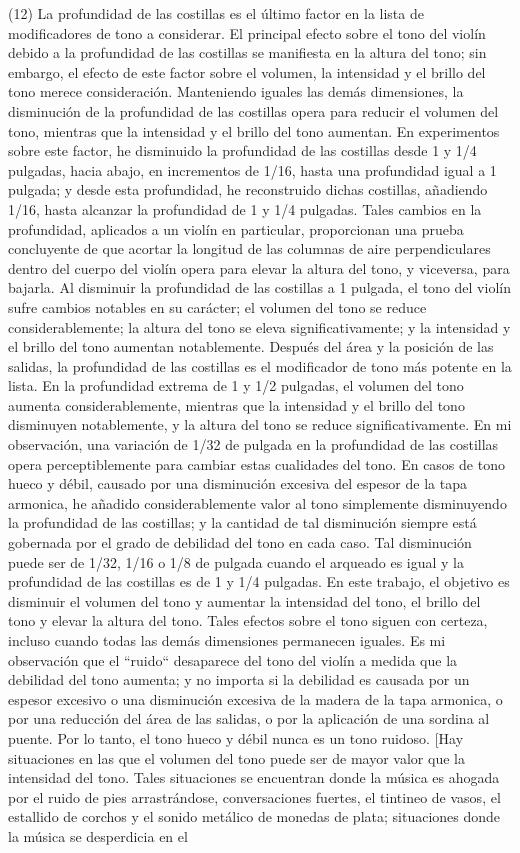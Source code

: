 \documentclass[12pt]{book}
\begin{document}
(12) La profundidad de las costillas es el último factor en la lista de modificadores de tono a considerar. El principal efecto sobre el tono del violín debido a la profundidad de las costillas se manifiesta en la altura del tono; sin embargo, el efecto de este factor sobre el volumen, la intensidad y el brillo del tono merece consideración. Manteniendo iguales las demás dimensiones, la disminución de la profundidad de las costillas opera para reducir el volumen del tono, mientras que la intensidad y el brillo del tono aumentan. En experimentos sobre este factor, he disminuido la profundidad de las costillas desde 1 y 1/4 pulgadas, hacia abajo, en incrementos de 1/16, hasta una profundidad igual a 1 pulgada; y desde esta profundidad, he reconstruido dichas costillas, añadiendo 1/16, hasta alcanzar la profundidad de 1 y 1/4 pulgadas. Tales cambios en la profundidad, aplicados a un violín en particular, proporcionan una prueba concluyente de que acortar la longitud de las columnas de aire perpendiculares dentro del cuerpo del violín opera para elevar la altura del tono, y viceversa, para bajarla. Al disminuir la profundidad de las costillas a 1 pulgada, el tono del violín sufre cambios notables en su carácter; el volumen del tono se reduce considerablemente; la altura del tono se eleva significativamente; y la intensidad y el brillo del tono aumentan notablemente. Después del área y la posición de las salidas, la profundidad de las costillas es el modificador de tono más potente en la lista. En la profundidad extrema de 1 y 1/2 pulgadas, el volumen del tono aumenta considerablemente, mientras que la intensidad y el brillo del tono disminuyen notablemente, y la altura del tono se reduce significativamente. En mi observación, una variación de 1/32 de pulgada en la profundidad de las costillas opera perceptiblemente para cambiar estas cualidades del tono. En casos de tono hueco y débil, causado por una disminución excesiva del espesor de la tapa armonica, he añadido considerablemente valor al tono simplemente disminuyendo la profundidad de las costillas; y la cantidad de tal disminución siempre está gobernada por el grado de debilidad del tono en cada caso. Tal disminución puede ser de 1/32, 1/16 o 1/8 de pulgada cuando el arqueado es igual y la profundidad de las costillas es de 1 y 1/4 pulgadas. En este trabajo, el objetivo es disminuir el volumen del tono y aumentar la intensidad del tono, el brillo del tono y elevar la altura del tono. Tales efectos sobre el tono siguen con certeza, incluso cuando todas las demás dimensiones permanecen iguales. Es mi observación que el ``ruido`` desaparece del tono del violín a medida que la debilidad del tono aumenta; y no importa si la debilidad es causada por un espesor excesivo o una disminución excesiva de la madera de la tapa armonica, o por una reducción del área de las salidas, o por la aplicación de una sordina al puente. Por lo tanto, el tono hueco y débil nunca es un tono ruidoso. [Hay situaciones en las que el volumen del tono puede ser de mayor valor que la intensidad del tono. Tales situaciones se encuentran donde la música es ahogada por el ruido de pies arrastrándose, conversaciones fuertes, el tintineo de vasos, el estallido de corchos y el sonido metálico de monedas de plata; situaciones donde la música se desperdicia en el 
\end{document}
